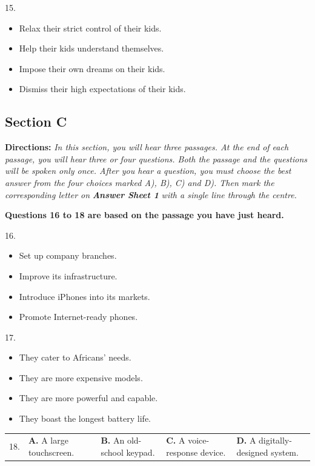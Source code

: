 \documentclass[UTF8,11pt]{ctexart}
\begin{document}
15.


\begin{itemize}[leftmargin=2em,itemsep=.2em,topsep=.4em]\item[A.] Relax their strict control of their kids.
\item[B.] Help their kids understand themselves.
\item[C.] Impose their own dreams on their kids.
\item[D.] Dismiss their high expectations of their kids.
\end{itemize}

\subsection*{\textbf{Section C}}


\textbf{Directions:}\textit{ In this section, you will hear three passages. At the end of each passage, you will hear} \textit{three or four questions. Both the passage and the questions will be spoken only once. After you hear a} \textit{question, you must choose the best answer from the four choices marked A), B), C) and D). Then} \textit{mark the corresponding letter on }\textbf{\textit{Answer Sheet 1}}\textit{ with a single line through the centre.}


\textbf{Questions 16 to 18 are based on the passage you have just heard.}


16.


\begin{itemize}[leftmargin=2em,itemsep=.2em,topsep=.4em]\item[A.] Set up company branches.
\item[B.] Improve its infrastructure.
\item[C.] Introduce iPhones into its markets.
\item[D.] Promote Internet-ready phones.
\end{itemize}

17.


\begin{itemize}[leftmargin=2em,itemsep=.2em,topsep=.4em]\item[A.] They cater to Africans’ needs.
\item[B.] They are more expensive models.
\item[C.] They are more powerful and capable.
\item[D.] They boast the longest battery life.
\end{itemize}

\noindent\begin{tabularx}{\linewidth}{@{}lXXXX@{}}18. & \textbf{A.} A large touchscreen. & \textbf{B.} An old-school keypad. & \textbf{C.} A voice-response device. & \textbf{D.} A digitally-designed system.\\\end{tabularx}\par
\end{document}

